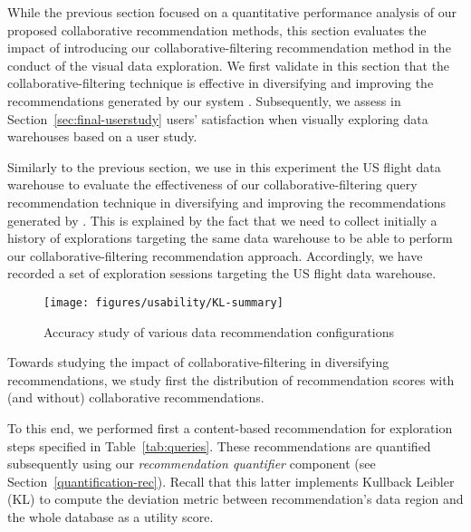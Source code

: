 \label{eva:usability}
While the previous section focused on a quantitative performance analysis of our proposed collaborative recommendation methods, this section evaluates the impact of introducing our collaborative-filtering recommendation method in the conduct of the visual data exploration.
We first validate in this section that the collaborative-filtering technique is effective in diversifying and improving the recommendations generated by our system \prototype{}. Subsequently, we assess in Section~\ref{sec:final-userstudy} users' satisfaction when visually exploring data warehouses based on a user study.


Similarly to the previous section, we use in this experiment the US flight data warehouse to evaluate the effectiveness of our collaborative-filtering query recommendation technique in diversifying and improving the recommendations generated by \prototype{}. This is explained by the fact that we need to collect initially a history of explorations targeting the same data warehouse to be able to perform our collaborative-filtering recommendation approach. 
Accordingly, we have recorded a set of exploration sessions targeting the US flight data warehouse.  



  \begin{figure}[b]
\centering
\texttt{[image: figures/usability/KL-summary]}
\caption{Accuracy study of various data recommendation configurations}
\label{fig:scores}
\end{figure}



Towards studying the impact of collaborative-filtering in diversifying recommendations, we study first the distribution of recommendation scores with (and without) collaborative recommendations.

To this end, we performed first a content-based recommendation for exploration steps specified in Table~\ref{tab:queries}. These recommendations are quantified subsequently using our \emph{recommendation quantifier} component (see Section~\ref{quantification-rec}). Recall that this latter implements Kullback Leibler (KL) to compute the deviation metric between recommendation's data region and the whole database as a utility score. 


